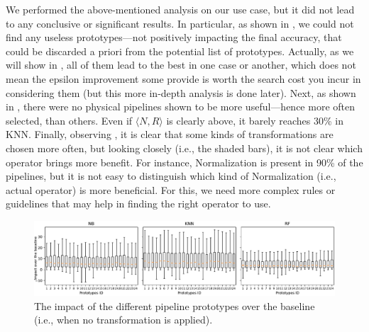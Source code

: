 \begin{example}
We performed the above-mentioned analysis on our use case, but it did not lead to any conclusive or significant results.
In particular, as shown in , we could not find any useless prototypes---not positively impacting the final accuracy, that could be discarded a priori from the potential list of prototypes.
Actually, as we will show in , all of them lead to the best in one case or another, which does not mean the epsilon improvement some provide is worth the search cost you incur in considering them (but this more in-depth analysis is done later).
Next, as shown in , there were no physical pipelines shown to be more useful---hence more often selected, than others.
Even if $\langle N , R \rangle$ is clearly above, it barely reaches 30\% in KNN.
Finally, observing , it is clear that some kinds of transformations are chosen more often, but looking closely (i.e., the shaded bars), it is not clear which operator brings more benefit.
For instance, Normalization is present in 90\% of the pipelines, but it is not easy to distinguish which kind of Normalization (i.e., actual operator) is more beneficial.
For this, we need more complex rules or guidelines that may help in finding the right operator to use.
\end{example}

\begin{figure}[!t]
	\centering
	\includegraphics[width=1.0\textwidth]{chapters/data-centric/supervised/img/prototypes_impact.pdf}
	\caption{The impact of the different pipeline prototypes over the baseline (i.e., when no transformation is applied).}
	\label{fig:prototypes-impact}
\end{figure}

